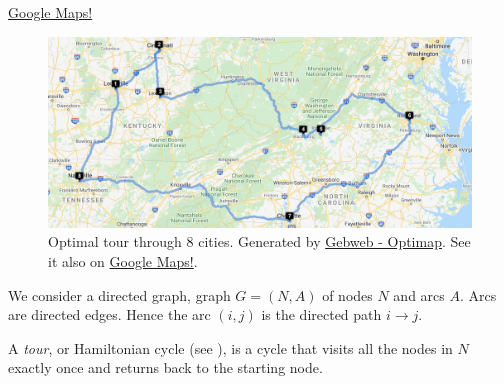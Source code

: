 \href{https://www.google.com/maps/dir/(38.2222341,+-85.75750389999999)/(39.0972041,+-84.52636389999999)/(38.0493956,+-84.4940986)/(37.1967465,+-80.4296817)/(37.2049884,+-79.9237747)/(37.5110489,+-77.40769019999999)/(35.2019605,+-80.81365720000001)/(36.1303318,+-86.78998039999999)/(38.2222341,+-85.75750389999999)/@36.8110947,-84.2113181,7.02z/data=!4m37!4m36!1m3!2m2!1d-85.7575039!2d38.2222341!1m3!2m2!1d-84.5263639!2d39.0972041!1m3!2m2!1d-84.4940986!2d38.0493956!1m3!2m2!1d-80.4296817!2d37.1967465!1m3!2m2!1d-79.9237747!2d37.2049884!1m3!2m2!1d-77.4076902!2d37.5110489!1m3!2m2!1d-80.8136572!2d35.2019605!1m3!2m2!1d-86.7899804!2d36.1303318!1m3!2m2!1d-85.7575039!2d38.2222341}{Google Maps!}

\begin{figure}
\includegraphics[scale = 0.5]{optimization/figures/figures-static/tsp-optimal-route}
\caption{Optimal tour through 8 cities.  Generated by \href{https://www.gebweb.net/optimap/}{Gebweb - Optimap}.  See it also on \href{https://www.google.com/maps/dir/(38.2222341,+-85.75750389999999)/(39.0972041,+-84.52636389999999)/(38.0493956,+-84.4940986)/(37.1967465,+-80.4296817)/(37.2049884,+-79.9237747)/(37.5110489,+-77.40769019999999)/(35.2019605,+-80.81365720000001)/(36.1303318,+-86.78998039999999)/(38.2222341,+-85.75750389999999)/@36.8110947,-84.2113181,7.02z/data=!4m37!4m36!1m3!2m2!1d-85.7575039!2d38.2222341!1m3!2m2!1d-84.5263639!2d39.0972041!1m3!2m2!1d-84.4940986!2d38.0493956!1m3!2m2!1d-80.4296817!2d37.1967465!1m3!2m2!1d-79.9237747!2d37.2049884!1m3!2m2!1d-77.4076902!2d37.5110489!1m3!2m2!1d-80.8136572!2d35.2019605!1m3!2m2!1d-86.7899804!2d36.1303318!1m3!2m2!1d-85.7575039!2d38.2222341}{Google Maps!}.}
\end{figure}


We consider a directed graph, graph $G = (N,A)$ of nodes $N$ and arcs $A$.   Arcs are directed edges.  Hence the arc $(i,j)$ is the directed path $i \to j$.

A \emph{tour}, or Hamiltonian cycle (see ), is a cycle that visits all the nodes in $N$ exactly once and returns back to the starting node.


